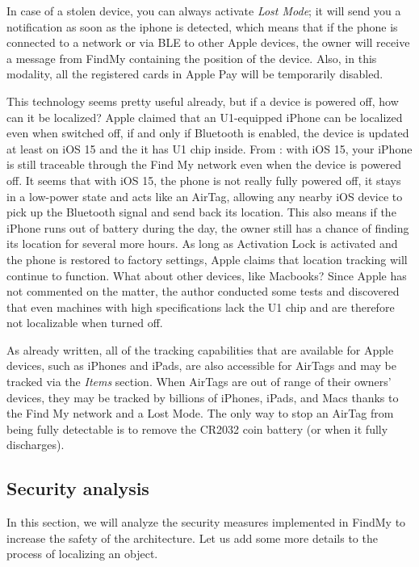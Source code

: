 \documentclass[english]{article}
\begin{document}
In case of a stolen device, you can always activate \textit{Lost Mode}; it will send you a notification as soon as the iphone is detected, which means that if the phone is connected to a network or via BLE to other Apple devices, the owner will receive a message from FindMy containing the position of the device. Also, in this modality, all the registered cards in Apple Pay will be temporarily disabled.

This technology seems pretty useful already, but if a device is powered off, how can it be localized? Apple claimed that an U1-equipped iPhone can be localized even when switched off, if and only if Bluetooth is enabled, the device is updated at least on iOS 15 and the it has U1 chip inside. From \cite{Mayo_2021}: with iOS 15, your iPhone is still traceable through the Find My network even when the device is powered off. 
It seems that with iOS 15, the phone is not really fully powered off, it stays in a low-power state and acts like an AirTag, allowing any nearby iOS device to pick up the Bluetooth signal and send back its location.
This also means if the iPhone runs out of battery during the day, the owner still has a chance of finding its location for several more hours. As long as Activation Lock is activated and the phone is restored to factory settings, Apple claims that location tracking will continue to function. What about other devices, like Macbooks? Since Apple has not commented on the matter, the author conducted some tests and discovered that even machines with high specifications lack the U1 chip and are therefore not localizable when turned off. 

As already written, all of the tracking capabilities that are available for Apple devices, such as iPhones and iPads, are also accessible for AirTags and may be tracked via the \textit{Items} section. When AirTags are out of range of their owners' devices, they may be tracked by billions of iPhones, iPads, and Macs thanks to the Find My network and a Lost Mode. The only way to stop an AirTag from being fully detectable is to remove the CR2032 coin battery (or when it fully discharges).

\subsection{Security analysis}
In this section, we will analyze the security measures implemented in FindMy to increase the safety of the architecture. Let us add some more details to the process of localizing an object.
\end{document}
